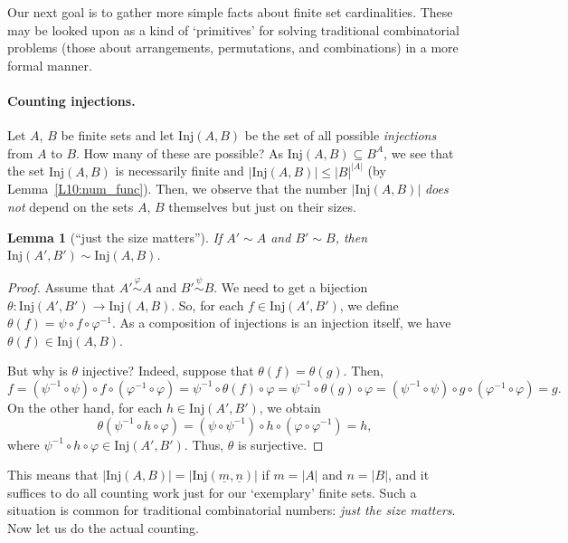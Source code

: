 \documentclass[12pt,notitlepage]{article}
\theoremstyle{plain}
\newtheorem{lemma}[thm]{Lemma}
\theoremstyle{definition}
\theoremstyle{plain}
\newcommand{\sbs}{\subseteq}
\renewcommand{\phi}{\varphi}
\newcommand{\ul}[1]{\underline{#1}}
\newcommand{\1}{\mathbf{1}}
\newcommand{\0}{\mathbf{0}}
\newcommand{\mcomm}[1]{}
\begin{document}
Our next goal is to gather more simple facts about finite set cardinalities. These may be looked upon as a kind of `primitives' for solving traditional combinatorial problems (those about arrangements, permutations, and combinations) in a more formal manner.

\paragraph{Counting injections.} Let $A$, $B$ be finite sets and let $\mathrm{Inj}(A,B)$ be the set of all possible \emph{injections} from $A$ to $B$.
How many of these are possible? As $\mathrm{Inj}(A,B) \sbs B^A$, we see that the set $\mathrm{Inj}(A,B)$ is necessarily finite and $|\mathrm{Inj}(A,B)| \leq |B|^{|A|}$ (by Lemma~\ref{L10:num_func}). Then, we observe that the number $|\mathrm{Inj}(A,B)|$ \emph{does not} depend on the sets $A$, $B$ themselves but just on their sizes.

\mcomm{Given enough time (which is unlikely in practice), the Instructor might prove similar results for all the following `combinatorial numbers' (which are omitted traditionally). We do not do it nevertheless.}
\begin{lemma}[``just the size matters'']\label{L11:JSM}
If $A' \sim A$ and $B' \sim B$, then $\mathrm{Inj}(A',B') \sim \mathrm{Inj}(A,B)$.
\end{lemma}
\begin{proof}
Assume that $A' \stackrel{\phi}{\sim} A$ and $B' \stackrel{\psi}{\sim} B$. We need to get a bijection $\theta\colon \mathrm{Inj}(A',B') \to \mathrm{Inj}(A,B)$. So, for each $f \in \mathrm{Inj}(A',B')$, we define $\theta(f) = \psi \circ f \circ \phi^{-1}$. As a composition of injections is an injection itself, we have $\theta(f) \in \mathrm{Inj}(A,B)$.

But why is $\theta$ injective? Indeed, suppose that $\theta(f) = \theta(g)$. Then,
$$f = (\psi^{-1} \circ \psi) \circ f \circ (\phi^{-1} \circ \phi) = \psi^{-1} \circ \theta(f) \circ \phi = \psi^{-1} \circ \theta(g) \circ \phi = (\psi^{-1} \circ \psi) \circ g \circ (\phi^{-1} \circ \phi) = g.$$
On the other hand, for each $h \in \mathrm{Inj}(A',B')$, we obtain
$$\theta(\psi^{-1} \circ h \circ \phi) = (\psi \circ \psi^{-1}) \circ h \circ (\phi \circ \phi^{-1}) = h,$$
where $\psi^{-1} \circ h \circ \phi \in \mathrm{Inj}(A',B')$. Thus, $\theta$ is surjective.
\end{proof}
This means that $|\mathrm{Inj}(A,B)| = |\mathrm{Inj}(\ul{m},\ul{n})|$ if $m = |A|$ and $n = |B|$, and it suffices to do all counting work just for our `exemplary' finite sets. Such a situation is common for traditional combinatorial numbers: \emph{just the size matters}. Now let us do the actual counting.
\end{document}
